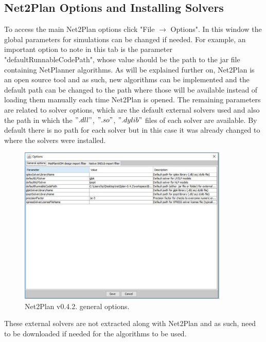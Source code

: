 	\subsection*{Net2Plan Options and Installing Solvers}
	\vspace{0.5cm}
	To access the main Net2Plan options click "File $\rightarrow$ Options". In this window the global parameters for simulations can be changed if needed.
	For example, an important option to note in this tab is the parameter "defaultRunnableCodePath", whose value should be the path to the jar file containing NetPlanner algorithms. As will be explained further on, Net2Plan is an open source tool and as such, new algorithms can be implemented and the default path can be changed to the path where those will be available instead of loading them manually each time Net2Plan is opened.	The remaining parameters are related to solver options, which are the default external solvers used and also the path in which the $".dll"$, $".so"$, $".dylib"$ files of each solver are available. By default there is no path for each solver but in this case it was already changed to where the solvers were installed.
	
	\begin{figure} [h!]
		\centering
		\includegraphics[width = 10cm]{Net2Plan_options.pdf}
		\caption{Net2Plan v0.4.2. general options.}
	\end{figure}
		
	These external solvers are not extracted along with Net2Plan and as such, need to be downloaded if needed for the algorithms to be used. 

